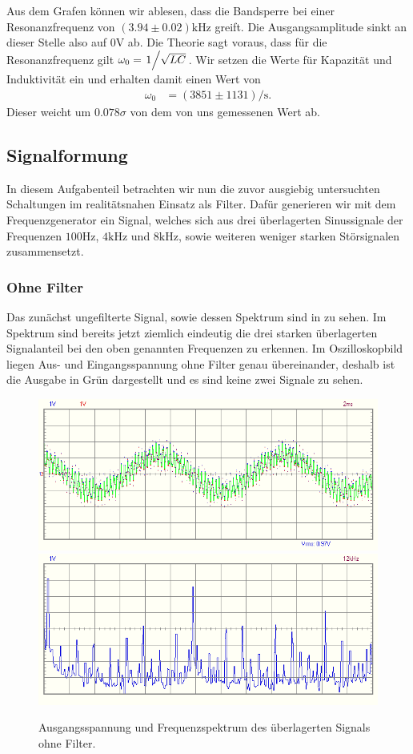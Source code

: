 Aus dem Grafen können wir ablesen, dass die Bandsperre bei einer Resonanzfrequenz von $(3.94 \pm 0.02)\si{\kilo\hertz}$ greift. Die Ausgangsamplitude sinkt an dieser Stelle also auf $0\si{\volt}$ ab. Die Theorie sagt voraus, dass für die Resonanzfrequenz gilt $\omega_0 = \flatfrac{1}{\sqrt{LC}}$. Wir setzen die Werte für Kapazität und Induktivität ein und erhalten damit einen Wert von
\begin{align}
  \omega_0 &= (3851 \pm 1131) \si{\per\second}.
\end{align}
Dieser weicht um $0.078\sigma$ von dem von uns gemessenen Wert ab.
\newpage
\subsection{Signalformung}

In diesem Aufgabenteil betrachten wir nun die zuvor ausgiebig untersuchten Schaltungen im realitätsnahen Einsatz als Filter. Dafür generieren wir mit dem Frequenzgenerator ein Signal, welches sich aus drei überlagerten Sinussignale der Frequenzen $100\si{\hertz}$, $4\si{\kilo\hertz}$ und $8\si{\kilo\hertz}$, sowie weiteren weniger starken Störsignalen zusammensetzt. 

\subsubsection*{Ohne Filter}

Das zunächst ungefilterte Signal, sowie dessen Spektrum sind in  zu sehen. Im Spektrum sind bereits jetzt ziemlich eindeutig die drei starken überlagerten Signalanteil bei den oben genannten Frequenzen zu erkennen. Im Oszilloskopbild liegen Aus- und Eingangsspannung ohne Filter genau übereinander, deshalb ist die Ausgabe in Grün dargestellt und es sind keine zwei Signale zu sehen.

\begin{figure}[H]
  \centering
  \includegraphics[width=.8\textwidth]{files/aufgabe8_teil1_osz.png}
  \includegraphics[width=.8\textwidth]{files/aufgabe8_teil1_spectrum.png}
  \caption{Ausgangsspannung und Frequenzspektrum des überlagerten Signals ohne Filter.}
  \label{fig:aufgabe8_teil1_osz}
\end{figure}

